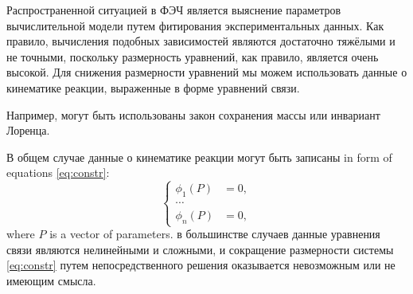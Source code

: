 Распространенной ситуацией в ФЭЧ является выяснение параметров вычислительной модели путем фитирования экспериментальных данных. Как правило, вычисления подобных зависимостей являются достаточно тяжёлыми и не точными, поскольку размерность уравнений, как правило, является очень высокой. Для снижения размерности уравнений мы можем использовать данные о кинематике реакции, выраженные в форме уравнений связи.

Например, могут быть использованы закон сохранения массы или инвариант Лоренца.

В общем случае данные о кинематике реакции могут быть записаны in form of equations \eqref{eq:constr}:
\begin{equation}
\label{eq:constr}
\left\{
\begin{aligned}
\phi_1(P) &= 0,\\
\cdots\\
\phi_n(P) &= 0,
\end{aligned}
\right.
\end{equation}
where $P$ is a vector of parameters.
в большинстве случаев данные уравнения связи являются нелинейными и сложными, и сокращение размерности системы \eqref{eq:constr} путем непосредственного решения оказывается невозможным или не имеющим смысла.
